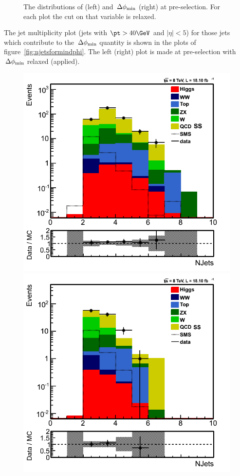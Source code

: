 \begin{figure}[!Hhtb]
\caption{The distributions of \MPT (left) and $\,{\Delta\phi_{\rm min}}$ (right) at pre-selection. For each plot the cut on that variable is relaxed.}
\label{fig:met_mindphi}
\end{figure}

The jet multiplicity plot (jets with $\pt>40\GeV$ and $|\eta|<5$) for those jets which contribute to the $\,{\Delta\phi_{\rm min}}$ quantity is shown in the plots of figure~\ref{fig:njetsformindphi}. The left (right) plot is made at pre-selection with $\,{\Delta\phi_{\rm min}}$ relaxed (applied).
\begin{figure}[!Hhtb]
\centering
\includegraphics[angle=0,scale=0.35]{TauTauFigs/NJets_MinDphirelaxed.png}
\includegraphics[angle=0,scale=0.35]{TauTauFigs/NJets.png} \\

\end{figure}
